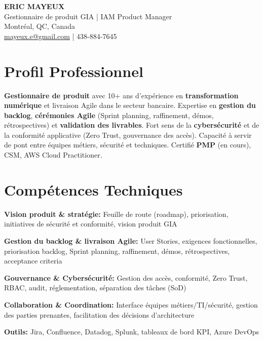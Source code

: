 \documentclass[11pt,a4paper]{article}
\begin{document}
\begin{center}
    {\LARGE \textbf{ERIC MAYEUX}}\\
    \vspace{4pt}
    {\large Gestionnaire de produit GIA | IAM Product Manager}\\
    \vspace{4pt}
    Montréal, QC, Canada\\
    \href{mailto:mayeux.e@gmail.com}{mayeux.e@gmail.com} | 438-884-7645
\end{center}

\vspace{8pt}

\section*{Profil Professionnel}
\noindent
\textbf{Gestionnaire de produit} avec 10+ ans d'expérience en \textbf{transformation numérique} et livraison Agile dans le secteur bancaire. Expertise en \textbf{gestion du backlog}, \textbf{cérémonies Agile} (Sprint planning, raffinement, démos, rétrospectives) et \textbf{validation des livrables}. Fort sens de la \textbf{cybersécurité} et de la conformité applicative (Zero Trust, gouvernance des accès). Capacité à servir de pont entre équipes métiers, sécurité et techniques. Certifié \textbf{PMP} (en cours), CSM, AWS Cloud Practitioner.

\section*{Compétences Techniques}

\textbf{Vision produit \& stratégie:} Feuille de route (roadmap), priorisation, initiatives de sécurité et conformité, vision produit GIA

\textbf{Gestion du backlog \& livraison Agile:} User Stories, exigences fonctionnelles, priorisation backlog, Sprint planning, raffinement, démos, rétrospectives, acceptance criteria

\textbf{Gouvernance \& Cybersécurité:} Gestion des accès, conformité, Zero Trust, RBAC, audit, réglementation, séparation des tâches (SoD)

\textbf{Collaboration \& Coordination:} Interface équipes métiers/TI/sécurité, gestion des parties prenantes, facilitation des décisions d'architecture

\textbf{Outils:} Jira, Confluence, Datadog, Splunk, tableaux de bord KPI, Azure DevOps
\end{document}
